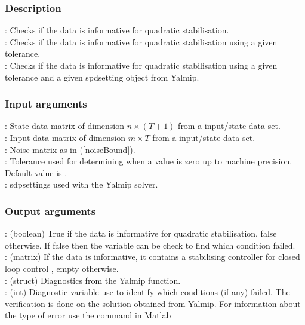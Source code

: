 \subsubsection*{Description}
: Checks if the data is informative for quadratic stabilisation. \\
: Checks if the data is informative for quadratic stabilisation using a given tolerance. \\
: Checks if the data is informative for quadratic stabilisation using a given tolerance and a given spdsetting object from Yalmip.

\subsubsection*{Input arguments}
\textbf{}: State data matrix of dimension $n \times (T+1)$ from a input/state data set.\\
\textbf{}: Input data matrix of dimension $m \times T$ from a input/state data set.\\
\textbf{}: Noise matrix as in (\ref{noiseBound}). \\ 
\textbf{}: Tolerance used for determining when a value is zero up to machine precision. Default value is .\\
\textbf{}: sdpsettings used with the Yalmip solver.

\subsubsection*{Output arguments}
\textbf{}: (boolean) True if the data is informative for quadratic stabilisation, false otherwise. If false then the  variable can be check to find which condition failed. \\
\textbf{}: (matrix) If the data is informative, it contains a stabilising controller  for closed loop control , empty otherwise.\\
\textbf{}: (struct) Diagnostics from the Yalmip  function. \\
\textbf{}: (int) Diagnostic variable use to identify which conditions (if any) failed. The verification is done on the solution obtained from Yalmip. For information about the type of error use the  command in Matlab

